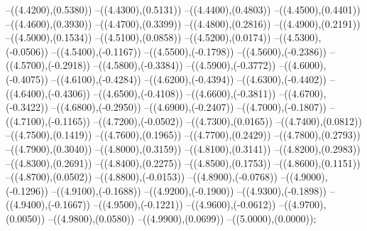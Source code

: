 {	--({\sx*(4.4200)},{\sy*(0.5380)})
	--({\sx*(4.4300)},{\sy*(0.5131)})
	--({\sx*(4.4400)},{\sy*(0.4803)})
	--({\sx*(4.4500)},{\sy*(0.4401)})
	--({\sx*(4.4600)},{\sy*(0.3930)})
	--({\sx*(4.4700)},{\sy*(0.3399)})
	--({\sx*(4.4800)},{\sy*(0.2816)})
	--({\sx*(4.4900)},{\sy*(0.2191)})
	--({\sx*(4.5000)},{\sy*(0.1534)})
	--({\sx*(4.5100)},{\sy*(0.0858)})
	--({\sx*(4.5200)},{\sy*(0.0174)})
	--({\sx*(4.5300)},{\sy*(-0.0506)})
	--({\sx*(4.5400)},{\sy*(-0.1167)})
	--({\sx*(4.5500)},{\sy*(-0.1798)})
	--({\sx*(4.5600)},{\sy*(-0.2386)})
	--({\sx*(4.5700)},{\sy*(-0.2918)})
	--({\sx*(4.5800)},{\sy*(-0.3384)})
	--({\sx*(4.5900)},{\sy*(-0.3772)})
	--({\sx*(4.6000)},{\sy*(-0.4075)})
	--({\sx*(4.6100)},{\sy*(-0.4284)})
	--({\sx*(4.6200)},{\sy*(-0.4394)})
	--({\sx*(4.6300)},{\sy*(-0.4402)})
	--({\sx*(4.6400)},{\sy*(-0.4306)})
	--({\sx*(4.6500)},{\sy*(-0.4108)})
	--({\sx*(4.6600)},{\sy*(-0.3811)})
	--({\sx*(4.6700)},{\sy*(-0.3422)})
	--({\sx*(4.6800)},{\sy*(-0.2950)})
	--({\sx*(4.6900)},{\sy*(-0.2407)})
	--({\sx*(4.7000)},{\sy*(-0.1807)})
	--({\sx*(4.7100)},{\sy*(-0.1165)})
	--({\sx*(4.7200)},{\sy*(-0.0502)})
	--({\sx*(4.7300)},{\sy*(0.0165)})
	--({\sx*(4.7400)},{\sy*(0.0812)})
	--({\sx*(4.7500)},{\sy*(0.1419)})
	--({\sx*(4.7600)},{\sy*(0.1965)})
	--({\sx*(4.7700)},{\sy*(0.2429)})
	--({\sx*(4.7800)},{\sy*(0.2793)})
	--({\sx*(4.7900)},{\sy*(0.3040)})
	--({\sx*(4.8000)},{\sy*(0.3159)})
	--({\sx*(4.8100)},{\sy*(0.3141)})
	--({\sx*(4.8200)},{\sy*(0.2983)})
	--({\sx*(4.8300)},{\sy*(0.2691)})
	--({\sx*(4.8400)},{\sy*(0.2275)})
	--({\sx*(4.8500)},{\sy*(0.1753)})
	--({\sx*(4.8600)},{\sy*(0.1151)})
	--({\sx*(4.8700)},{\sy*(0.0502)})
	--({\sx*(4.8800)},{\sy*(-0.0153)})
	--({\sx*(4.8900)},{\sy*(-0.0768)})
	--({\sx*(4.9000)},{\sy*(-0.1296)})
	--({\sx*(4.9100)},{\sy*(-0.1688)})
	--({\sx*(4.9200)},{\sy*(-0.1900)})
	--({\sx*(4.9300)},{\sy*(-0.1898)})
	--({\sx*(4.9400)},{\sy*(-0.1667)})
	--({\sx*(4.9500)},{\sy*(-0.1221)})
	--({\sx*(4.9600)},{\sy*(-0.0612)})
	--({\sx*(4.9700)},{\sy*(0.0050)})
	--({\sx*(4.9800)},{\sy*(0.0580)})
	--({\sx*(4.9900)},{\sy*(0.0699)})
	--({\sx*(5.0000)},{\sy*(0.0000)});
}
